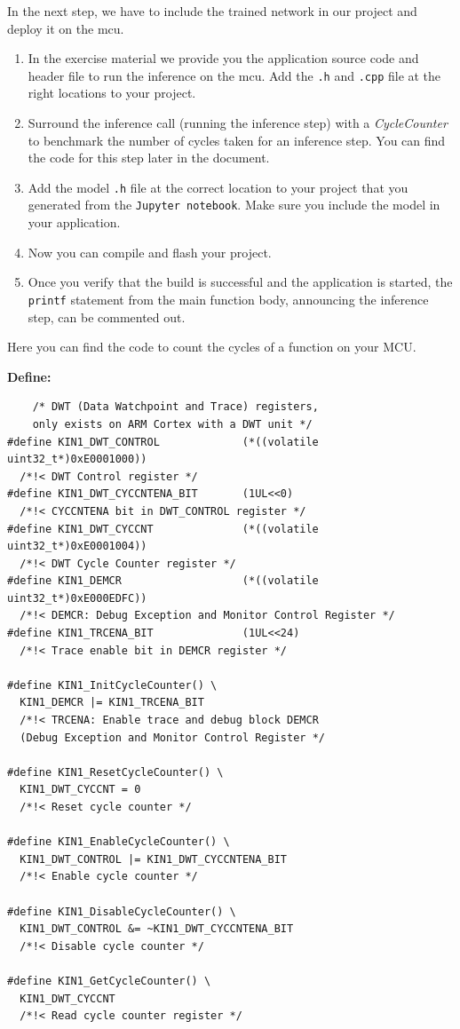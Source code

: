 \documentclass[parskip=half,notes,cadrem,toolver]{iisvlsi}
\begin{document}
In the next step, we have to include the trained network in our project and deploy it on the \gls{mcu}. 

\begin{studtask}
    \begin{enumerate}
    \item In the exercise material we provide you the application source code and header file to run the inference on the \gls{mcu}. Add the \texttt{.h} and \texttt{.cpp} file at the right locations to your project.
    \item Surround the inference call (running the inference step) with a \textit{CycleCounter} to benchmark the number of cycles taken for an inference step. You can find the code for this step later in the document.
    \item Add the model \texttt{.h} file at the correct location to your project that you generated from the \texttt{Jupyter notebook}. Make sure you include the model in your application. 
    \item Now you can compile and flash your project.
    \item Once you verify that the build is successful and the application is started, the \texttt{printf} statement from the main function body, announcing the inference step, can be commented out.
    \end{enumerate}
\end{studtask}

Here you can find the code to count the cycles of a function on your MCU.

\textbf{Define:}
\begin{verbatim}
    /* DWT (Data Watchpoint and Trace) registers, 
    only exists on ARM Cortex with a DWT unit */
#define KIN1_DWT_CONTROL             (*((volatile uint32_t*)0xE0001000))
  /*!< DWT Control register */
#define KIN1_DWT_CYCCNTENA_BIT       (1UL<<0)
  /*!< CYCCNTENA bit in DWT_CONTROL register */
#define KIN1_DWT_CYCCNT              (*((volatile uint32_t*)0xE0001004))
  /*!< DWT Cycle Counter register */
#define KIN1_DEMCR                   (*((volatile uint32_t*)0xE000EDFC))
  /*!< DEMCR: Debug Exception and Monitor Control Register */
#define KIN1_TRCENA_BIT              (1UL<<24)
  /*!< Trace enable bit in DEMCR register */

#define KIN1_InitCycleCounter() \
  KIN1_DEMCR |= KIN1_TRCENA_BIT
  /*!< TRCENA: Enable trace and debug block DEMCR 
  (Debug Exception and Monitor Control Register */

#define KIN1_ResetCycleCounter() \
  KIN1_DWT_CYCCNT = 0
  /*!< Reset cycle counter */

#define KIN1_EnableCycleCounter() \
  KIN1_DWT_CONTROL |= KIN1_DWT_CYCCNTENA_BIT
  /*!< Enable cycle counter */

#define KIN1_DisableCycleCounter() \
  KIN1_DWT_CONTROL &= ~KIN1_DWT_CYCCNTENA_BIT
  /*!< Disable cycle counter */

#define KIN1_GetCycleCounter() \
  KIN1_DWT_CYCCNT
  /*!< Read cycle counter register */
\end{verbatim}
\end{document}
